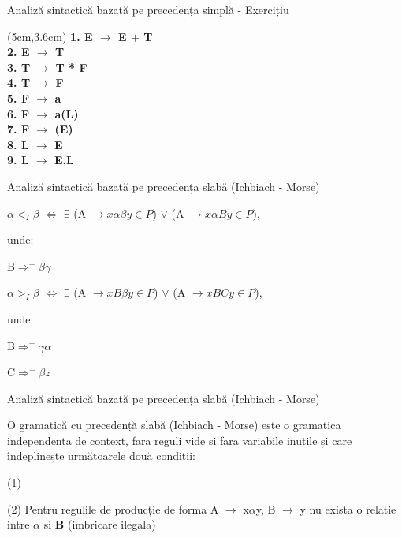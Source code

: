 \documentclass[pdf]{beamer}
\begin{document}
\begin{frame}{Analiză sintactică bazată pe precedența simplă - Exercițiu}    
    \begin{textblock*}{14cm}(5cm,3.6cm)
    \textbf{1. E $\rightarrow$ E $+$ T}\\
    \textbf{2. E $\to$ T}\\
    \textbf{3. T $\to$ T * F}\\
    \textbf{4. T $\to$ F}\\
    \textbf{5. F $\to$ a}\\
    \textbf{6. F $\to$ a(L)}\\
    \textbf{7. F $\to$ (E)}\\
    \textbf{8. L $\to$ E}\\
    \textbf{9. L $\to$ E,L}
    \end{textblock*}
\end{frame}



\begin{frame}
{Analiză sintactică bazată pe precedența slabă (Ichbiach - Morse)}

\color{black}{ $\beta \in \Sigma$ }
\newline

\color{black}{ (1)} \color{red} $\alpha <_{I} \beta$ \color{black} $\iff$ \color{blue} $\exists$ (A $\rightarrow x \alpha \beta y \in P$) $\lor$ (A $\rightarrow  x  \alpha By \in P$), 

unde:

B$\Rightarrow^+\beta\gamma$
\newline

\color{black}{ (2)} \color{red} $\alpha >_{I} \beta$ \color{black} $\iff$ $\exists$ \color{blue} (A $\rightarrow x B \beta y \in P$) $\lor$ (A $\rightarrow x B C y \in P$), 

unde:

B$\Rightarrow^+ \gamma \alpha$

C$\Rightarrow^+ \beta z$

\end{frame}



\begin{frame}
{Analiză sintactică bazată pe precedența slabă (Ichbiach - Morse)}

\newline

\color{black} O gramatică cu precedență slabă (Ichbiach - Morse) este o gramatica independenta de context, fara reguli vide si fara  variabile inutile și care îndeplinește următoarele două condiții:

(1) 

\color{black} 
(2) Pentru regulile de producție de forma \color{blue} A $\rightarrow$ x$\alpha$y, B $\rightarrow$ y \color{black} nu exista o relatie intre \color{red} {$\alpha$} \color{black} si \color{red}\textbf B \color{red} {(imbricare ilegala)}\color{black}

\end{frame}
\end{document}
